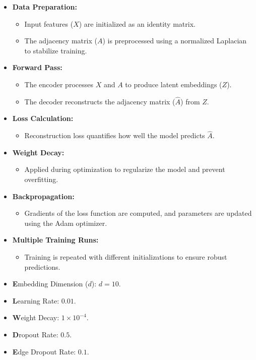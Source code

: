\documentclass{article}
\newcounter{subsubsubsection}[subsubsection]
\begin{document}
\begin{itemize}
    \item \textbf{Data Preparation:}
    \begin{itemize}
        \item Input features (\(X\)) are initialized as an identity matrix.
        \item The adjacency matrix (\(A\)) is preprocessed using a normalized Laplacian to stabilize training.
    \end{itemize}
    \item \textbf{Forward Pass:}
    \begin{itemize}
        \item The encoder processes \(X\) and \(A\) to produce latent embeddings (\(Z\)).
        \item The decoder reconstructs the adjacency matrix (\(\hat{A}\)) from \(Z\).
    \end{itemize}
    \item \textbf{Loss Calculation:}  
    \begin{itemize}
        \item Reconstruction loss quantifies how well the model predicts \(\hat{A}\).
    \end{itemize}
    \item \textbf{Weight Decay:} 
    \begin{itemize}
        \item Applied during optimization to regularize the model and prevent overfitting.
    \end{itemize}
    \item \textbf{Backpropagation:}  
    \begin{itemize}
        \item Gradients of the loss function are computed, and parameters are updated using the Adam optimizer.
    \end{itemize}
    \item \textbf{Multiple Training Runs:}  
    \begin{itemize}
        \item Training is repeated with different initializations to ensure robust predictions.
    \end{itemize}
\end{itemize}

\begin{itemize}
    \item \textbf Embedding Dimension (\(d\)): \(d=10\).
    \item \textbf Learning Rate: \(0.01\).
    \item \textbf Weight Decay: \(1 \times 10^{-4}\).
    \item \textbf Dropout Rate: \(0.5\).
    \item \textbf Edge Dropout Rate: \(0.1\).
\end{itemize}
\end{document}
